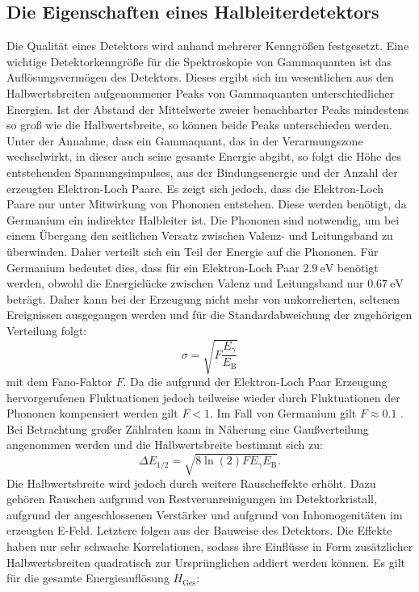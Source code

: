 \subsection{Die Eigenschaften eines Halbleiterdetektors}%
\label{subsec:eighat}
Die Qualität eines Detektors wird anhand mehrerer Kenngrößen festgesetzt.
Eine wichtige Detektorkenngröße für die Spektroskopie von Gammaquanten ist das Auflösungsvermögen des Detektors. Dieses ergibt sich im wesentlichen aus den Halbwertsbreiten aufgenommener Peaks von Gammaquanten unterschiedlicher Energien. 
Ist der Abstand der Mittelwerte zweier benachbarter Peaks mindestens so groß wie die Halbwertsbreite, so können beide Peaks unterschieden werden. Unter der Annahme, dass ein Gammaquant, das in der Verarmungszone wechselwirkt, in dieser auch seine gesamte Energie abgibt, so folgt die Höhe des entstehenden Spannungsimpulses, aus der Bindungsenergie und der Anzahl der erzeugten Elektron-Loch Paare. Es zeigt sich jedoch, dass die Elektron-Loch Paare nur unter Mitwirkung von Phononen entstehen. Diese werden benötigt, da Germanium ein indirekter Halbleiter ist. Die Phononen sind notwendig, um bei einem Übergang den seitlichen Versatz zwischen Valenz- und Leitungsband zu überwinden. Daher verteilt sich ein Teil der Energie auf die Phononen. Für Germanium bedeutet dies, dass für ein Elektron-Loch Paar $\SI{2.9}{\electronvolt}$ benötigt werden, obwohl die Energielücke zwischen Valenz und Leitungsband nur $\SI{0.67}{\electronvolt}$ beträgt. Daher kann bei der Erzeugung nicht mehr von unkorrelierten, seltenen Ereignissen ausgegangen werden und für die Standardabweichung der zugehörigen Verteilung folgt:
\begin{equation}
\sigma = \sqrt{F \frac{E_\gamma}{E_\text{B}} }
\end{equation}
mit dem Fano-Faktor $F$. Da die aufgrund der Elektron-Loch Paar Erzeugung hervorgerufenen Fluktuationen jedoch teilweise wieder durch Fluktuationen der Phononen kompensiert werden gilt $F < 1$. Im Fall von Germanium gilt $F \approx 0.1$ \cite{V18}. Bei Betrachtung großer Zählraten kann in Näherung eine Gaußverteilung angenommen werden und die Halbwertsbreite bestimmt sich zu:
\begin{equation}
\Delta E_\text{1/2} = \sqrt{8 \ln(2) F E_\gamma E_\text{B}} \label{eq:deltE}.
\end{equation}
Die Halbwertsbreite wird jedoch durch weitere Rauscheffekte erhöht. Dazu gehören Rauschen aufgrund von Restverunreinigungen im Detektorkristall, aufgrund der angeschlossenen Verstärker und aufgrund von Inhomogenitäten im erzeugten E-Feld. Letztere folgen aus der Bauweise des Detektors. Die Effekte haben nur sehr schwache Korrelationen, sodass ihre Einflüsse in Form zusätzlicher Halbwertsbreiten quadratisch zur Ursprünglichen addiert werden können. Es gilt für die gesamte Energieauflösung $H_\text{Ges}$:
